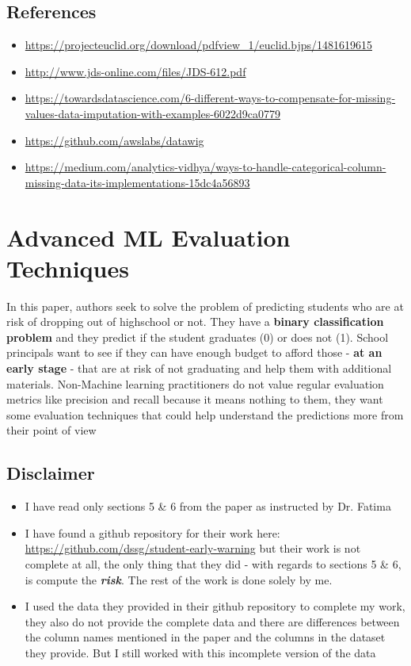 \documentclass{article}
\begin{document}
\subsection*{References}
\begin{itemize}
\item \url{https://projecteuclid.org/download/pdfview_1/euclid.bjps/1481619615}

\item \url{http://www.jds-online.com/files/JDS-612.pdf}

\item\url{ https://towardsdatascience.com/6-different-ways-to-compensate-for-missing-values-data-imputation-with-examples-6022d9ca0779}
\item \url{https://github.com/awslabs/datawig}
\item \url{https://medium.com/analytics-vidhya/ways-to-handle-categorical-column-missing-data-its-implementations-15dc4a56893}
\end{itemize}



\section{Advanced ML Evaluation Techniques}
In this paper, authors seek to solve the problem of predicting students who are at risk of dropping out of highschool or not. They have a \textbf{binary classification problem} and they predict if the student graduates (0) or does not (1). School principals want to see if they can have enough budget to afford those - \textbf{at an early stage} - that are at risk of not graduating and help them with additional materials. Non-Machine learning practitioners do not value regular evaluation metrics like precision and recall because it means nothing to them, they want some evaluation techniques that could help understand the predictions more from their point of view

\subsection*{Disclaimer}
\begin{itemize}
\item I have read only sections 5 \& 6 from the paper as instructed by Dr. Fatima
\item I have found a github repository for their work here: \url{https://github.com/dssg/student-early-warning} but their work is not complete at all, the only thing that they did - with regards to sections 5 \& 6, is compute the \textbf{\textit{risk}}. The rest of the work is done solely by me. 
\item I used the data they provided in their github repository to complete my work, they also do not provide the complete data and there are differences between the column names mentioned in the paper and the columns in the dataset they provide. But I still worked with this incomplete version of the data 
\end{itemize}
\end{document}
